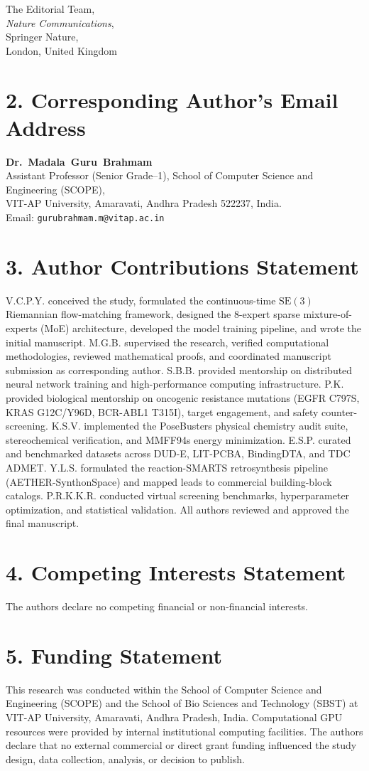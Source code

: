 \documentclass[11pt]{letter}
\begin{document}
\begin{letter}{%
    The Editorial Team,\\
    \textit{Nature Communications},\\
    Springer Nature,\\
    London, United Kingdom
}
\section*{2. Corresponding Author's Email Address}
\textbf{Dr.~Madala~Guru~Brahmam}\\
Assistant Professor (Senior Grade--1), School of Computer Science and Engineering (SCOPE),\\
VIT-AP University, Amaravati, Andhra Pradesh 522237, India.\\
Email: \texttt{gurubrahmam.m@vitap.ac.in}

\section*{3. Author Contributions Statement}
V.C.P.Y. conceived the study, formulated the continuous-time $\mathrm{SE}(3)$ Riemannian flow-matching framework, designed the 8-expert sparse mixture-of-experts (MoE) architecture, developed the model training pipeline, and wrote the initial manuscript. M.G.B. supervised the research, verified computational methodologies, reviewed mathematical proofs, and coordinated manuscript submission as corresponding author. S.B.B. provided mentorship on distributed neural network training and high-performance computing infrastructure. P.K. provided biological mentorship on oncogenic resistance mutations (EGFR C797S, KRAS G12C/Y96D, BCR-ABL1 T315I), target engagement, and safety counter-screening. K.S.V. implemented the PoseBusters physical chemistry audit suite, stereochemical verification, and MMFF94s energy minimization. E.S.P. curated and benchmarked datasets across DUD-E, LIT-PCBA, BindingDTA, and TDC ADMET. Y.L.S. formulated the reaction-SMARTS retrosynthesis pipeline (AETHER-SynthonSpace) and mapped leads to commercial building-block catalogs. P.R.K.K.R. conducted virtual screening benchmarks, hyperparameter optimization, and statistical validation. All authors reviewed and approved the final manuscript.

\section*{4. Competing Interests Statement}
The authors declare no competing financial or non-financial interests.

\section*{5. Funding Statement}
This research was conducted within the School of Computer Science and Engineering (SCOPE) and the School of Bio Sciences and Technology (SBST) at VIT-AP University, Amaravati, Andhra Pradesh, India. Computational GPU resources were provided by internal institutional computing facilities. The authors declare that no external commercial or direct grant funding influenced the study design, data collection, analysis, or decision to publish.


\end{letter}
\end{document}
